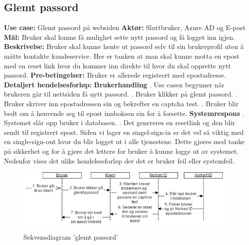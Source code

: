 \subsection{Glemt passord}
\label{subsec:use_case_glemt_passord}
\newline \textbf{Use case:} Glemt passord på websiden
\newline \textbf{Aktør:}	Sluttbruker, Azure AD og E-post
\newline \textbf{Mål:} Bruker skal kunne få mulighet sette nytt passord og få logget inn igjen.
\newline \textbf{Beskrivelse:} Bruker skal kunne hente ut passord selv til sin brukerprofil uten å måtte kontakte kundeservice. Her er tanken at man skal kunne motta en epost med en reset link hvor du kommer inn direkte til hvor du skal opprette nytt passord.
\newline \textbf{Pre-betingelser:} Bruker er allerede registrert med epostadresse.
\newline \textbf{Detaljert hendelsesforløp:}
\newline
\newline \textbf{Brukerhandling}
. Use casen begynner når brukeren går til nettsiden få nytt passord.
. Bruker klikker på glemt passord.
. Bruker skriver inn epostadressen sin og bekrefter en captcha test.
. Bruker blir bedt om å henvende seg til epost innboksen sin for å forsette.
\newline
\newline \textbf{Systemrespons}
. Systemet slår opp bruker i databasen.
. Det genereres en resetlink og den blir sendt til registrert epost.
\newline
\newline
Siden vi lager en singel-sign-in er det vel så viktig med en single-sign-out hvor du blir logget ut i alle tjenestene. Dette gjøres med tanke på sikkerhet og for å gjøre det lettere for bruker å kunne logge ut av systemet.
\newline
\newline
Nedenfor vises det ulike hendelsesforløp der det er bruker feil eller systemfeil.
\newline

\begin{figure}[H]
    \centering
    \includegraphics[scale=0.55]{graphics/04-arkitektur/UseCaseSekveknsdiagramGlemtPassord.jpg}
    \caption{Sekvensdiagram 'glemt passord'}
    \label{fig:skevensdiagramGlemtPassord}
\end{figure}

